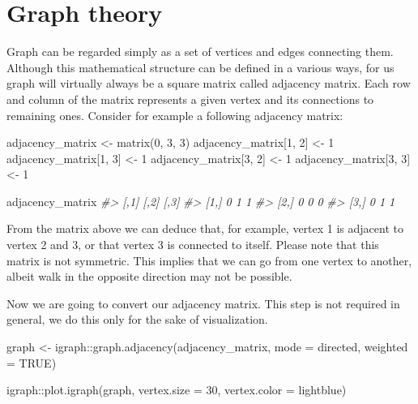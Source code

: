 \documentclass[
]{book}
\newenvironment{Shaded}{\begin{snugshade}}{\end{snugshade}}
\newcommand{\AttributeTok}[1]{\textcolor[rgb]{0.77,0.63,0.00}{#1}}
\newcommand{\CommentTok}[1]{\textcolor[rgb]{0.56,0.35,0.01}{\textit{#1}}}
\newcommand{\ConstantTok}[1]{\textcolor[rgb]{0.00,0.00,0.00}{#1}}
\newcommand{\DecValTok}[1]{\textcolor[rgb]{0.00,0.00,0.81}{#1}}
\newcommand{\FunctionTok}[1]{\textcolor[rgb]{0.00,0.00,0.00}{#1}}
\newcommand{\NormalTok}[1]{#1}
\newcommand{\OtherTok}[1]{\textcolor[rgb]{0.56,0.35,0.01}{#1}}
\newcommand{\SpecialCharTok}[1]{\textcolor[rgb]{0.00,0.00,0.00}{#1}}
\newcommand{\StringTok}[1]{\textcolor[rgb]{0.31,0.60,0.02}{#1}}
\begin{document}
\hypertarget{graph}{%
\chapter{Graph theory}\label{graph}}

Graph can be regarded simply as a set of vertices and edges connecting them. Although this mathematical structure can be defined in a various ways, for us graph will virtually always be a square matrix called adjacency matrix. Each row and column of the matrix represents a given vertex and its connections to remaining ones. Consider for example a following adjacency matrix:

\begin{Shaded}
\begin{Highlighting}[]
\NormalTok{adjacency\_matrix }\OtherTok{\textless{}{-}} \FunctionTok{matrix}\NormalTok{(}\DecValTok{0}\NormalTok{, }\DecValTok{3}\NormalTok{, }\DecValTok{3}\NormalTok{)}
\NormalTok{adjacency\_matrix[}\DecValTok{1}\NormalTok{, }\DecValTok{2}\NormalTok{] }\OtherTok{\textless{}{-}} \DecValTok{1}
\NormalTok{adjacency\_matrix[}\DecValTok{1}\NormalTok{, }\DecValTok{3}\NormalTok{] }\OtherTok{\textless{}{-}} \DecValTok{1}
\NormalTok{adjacency\_matrix[}\DecValTok{3}\NormalTok{, }\DecValTok{2}\NormalTok{] }\OtherTok{\textless{}{-}} \DecValTok{1}
\NormalTok{adjacency\_matrix[}\DecValTok{3}\NormalTok{, }\DecValTok{3}\NormalTok{] }\OtherTok{\textless{}{-}} \DecValTok{1}

\NormalTok{adjacency\_matrix}
\CommentTok{\#\textgreater{}      [,1] [,2] [,3]}
\CommentTok{\#\textgreater{} [1,]    0    1    1}
\CommentTok{\#\textgreater{} [2,]    0    0    0}
\CommentTok{\#\textgreater{} [3,]    0    1    1}
\end{Highlighting}
\end{Shaded}

From the matrix above we can deduce that, for example, vertex 1 is adjacent to vertex 2 and 3, or that vertex 3 is connected to itself. Please note that this matrix is not symmetric. This implies that we can go from one vertex to another, albeit walk in the opposite direction may not be possible.

Now we are going to convert our adjacency matrix. This step is not required in general, we do this only for the sake of visualization.

\begin{Shaded}
\begin{Highlighting}[]
\NormalTok{graph }\OtherTok{\textless{}{-}}\NormalTok{ igraph}\SpecialCharTok{::}\FunctionTok{graph.adjacency}\NormalTok{(adjacency\_matrix, }\AttributeTok{mode =} \StringTok{\textquotesingle{}directed\textquotesingle{}}\NormalTok{, }\AttributeTok{weighted =} \ConstantTok{TRUE}\NormalTok{)}

\NormalTok{igraph}\SpecialCharTok{::}\FunctionTok{plot.igraph}\NormalTok{(graph, }\AttributeTok{vertex.size =} \DecValTok{30}\NormalTok{, }\AttributeTok{vertex.color =} \StringTok{\textquotesingle{}lightblue\textquotesingle{}}\NormalTok{)}
\end{Highlighting}
\end{Shaded}
\end{document}
